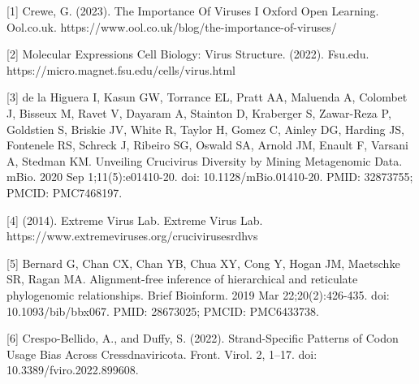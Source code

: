 \documentclass[eng]{ajceam-class}
\begin{document}
[1] Crewe, G. (2023). The Importance Of Viruses I Oxford Open Learning. Ool.co.uk. https://www.ool.co.uk/blog/the-importance-of-viruses/

[2] Molecular Expressions Cell Biology: Virus Structure. (2022). Fsu.edu. https://micro.magnet.fsu.edu/cells/virus.html

[3] de la Higuera I, Kasun GW, Torrance EL, Pratt AA, Maluenda A, Colombet J, Bisseux M, Ravet V, Dayaram A, Stainton D, Kraberger S, Zawar-Reza P, Goldstien S, Briskie JV, White R, Taylor H, Gomez C, Ainley DG, Harding JS, Fontenele RS, Schreck J, Ribeiro SG, Oswald SA, Arnold JM, Enault F, Varsani A, Stedman KM. Unveiling Crucivirus Diversity by Mining Metagenomic Data. mBio. 2020 Sep 1;11(5):e01410-20. doi: 10.1128/mBio.01410-20. PMID: 32873755; PMCID: PMC7468197.

[4] (2014). Extreme Virus Lab. Extreme Virus Lab. https://www.extremeviruses.org/crucivirusesrdhvs

[5] Bernard G, Chan CX, Chan YB, Chua XY, Cong Y, Hogan JM, Maetschke SR, Ragan MA. Alignment-free inference of hierarchical and reticulate phylogenomic relationships. Brief Bioinform. 2019 Mar 22;20(2):426-435. doi: 10.1093/bib/bbx067. PMID: 28673025; PMCID: PMC6433738.

[6] Crespo-Bellido, A., and Duffy, S. (2022). Strand-Specific Patterns of Codon Usage Bias Across Cressdnaviricota. Front. Virol. 2, 1–17. doi: 10.3389/fviro.2022.899608.
‌
\end{document}
